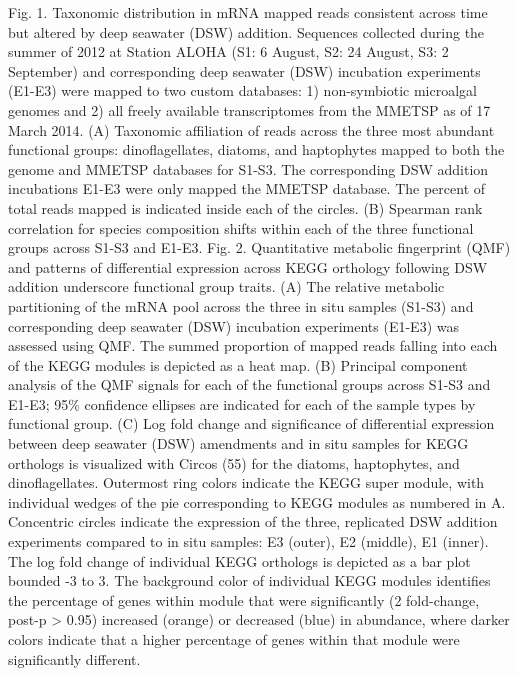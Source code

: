 Fig. 1. Taxonomic distribution in mRNA mapped reads consistent across time but altered by deep seawater (DSW) addition. Sequences collected during the summer of 2012 at Station ALOHA (S1: 6 August, S2: 24 August, S3: 2 September) and corresponding deep seawater (DSW) incubation experiments (E1-E3) were mapped to two custom databases: 1) non-symbiotic microalgal genomes and 2) all freely available transcriptomes from the MMETSP as of 17 March 2014. (A) Taxonomic affiliation of reads across the three most abundant functional groups: dinoflagellates, diatoms, and haptophytes mapped to both the genome and MMETSP databases for S1-S3. The corresponding DSW addition incubations E1-E3 were only mapped the MMETSP database. The percent of total reads mapped is indicated inside each of the circles. (B) Spearman rank correlation for species composition shifts within each of the three functional groups across S1-S3 and E1-E3. 
Fig. 2. Quantitative metabolic fingerprint (QMF) and patterns of differential expression across KEGG orthology following DSW addition underscore functional group traits. (A) The relative metabolic partitioning of the mRNA pool across the three in situ samples (S1-S3) and corresponding deep seawater (DSW) incubation experiments (E1-E3) was assessed using QMF. The summed proportion of mapped reads falling into each of the KEGG modules is depicted as a heat map. (B) Principal component analysis of the QMF signals for each of the functional groups across S1-S3 and E1-E3; 95\% confidence ellipses are indicated for each of the sample types by functional group. (C) Log fold change and significance of differential expression between deep seawater (DSW) amendments and in situ samples for KEGG orthologs is visualized with Circos (55) for the diatoms, haptophytes, and dinoflagellates. Outermost ring colors indicate the KEGG super module, with individual wedges of the pie corresponding to KEGG modules as numbered in A. Concentric circles indicate the expression of the three, replicated DSW addition experiments compared to in situ samples: E3 (outer), E2 (middle), E1 (inner). The log fold change of individual KEGG orthologs is depicted as a bar plot bounded -3 to 3. The background color of individual KEGG modules identifies the percentage of genes within module that were significantly (2 fold-change, post-p > 0.95) increased (orange) or decreased (blue) in abundance, where darker colors indicate that a higher percentage of genes within that module were significantly different. 
